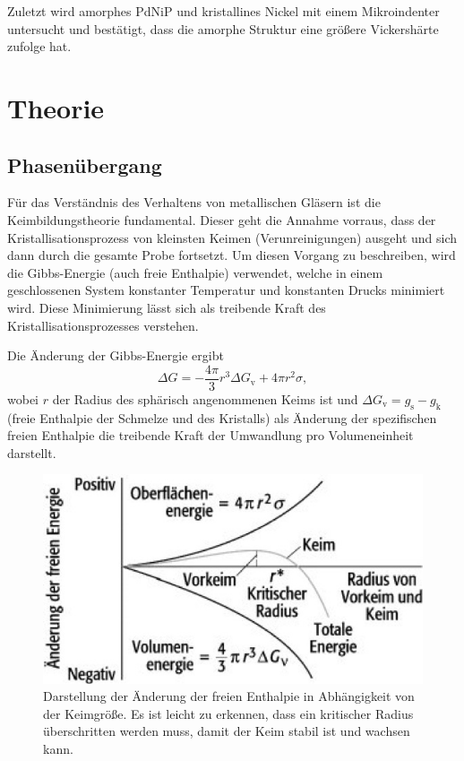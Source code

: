 \documentclass[
	a4paper,
	12pt,
	pagesize,
	ngerman
]{scrartcl}
\begin{document}
	Zuletzt wird amorphes PdNiP und kristallines Nickel mit einem Mikroindenter untersucht und bestätigt, dass die amorphe Struktur eine größere Vickershärte zufolge hat.

  \section{Theorie}

	\subsection{Phasenübergang}

	Für das Verständnis des Verhaltens von metallischen Gläsern ist die Keimbildungstheorie fundamental.
	Dieser geht die Annahme vorraus, dass der Kristallisationsprozess von kleinsten Keimen (Verunreinigungen) ausgeht und sich dann durch die gesamte Probe fortsetzt.
	Um diesen Vorgang zu beschreiben, wird die Gibbs-Energie (auch freie Enthalpie) verwendet, welche in einem geschlossenen System konstanter Temperatur und konstanten Drucks minimiert wird.
	Diese Minimierung lässt sich als treibende Kraft des Kristallisationsprozesses verstehen.


	Die Änderung der Gibbs-Energie ergibt
	\begin{equation} %
		\label{eq_gibbs}
		\Delta G = - \frac{4 \pi}{3} r^3 \Delta G_\text{v} + 4 \pi r^2 \sigma ,
	\end{equation}
	wobei $r$ der Radius des sphärisch angenommenen Keims ist und $\Delta G_\text{v} = g_\text{s} - g_\text{k}$ (freie Enthalpie der Schmelze und des Kristalls) als Änderung der spezifischen freien Enthalpie die treibende Kraft der Umwandlung pro Volumeneinheit darstellt.

	\begin{figure}[H]
			\includegraphics[width= 0.5 \linewidth]{img/radius}
			\caption{
			Darstellung der Änderung der freien Enthalpie in Abhängigkeit von der Keimgröße.
			Es ist leicht zu erkennen, dass ein kritischer Radius überschritten werden muss, damit der Keim stabil ist und wachsen kann.
			\cite{radius_enthalpie}
			}
			\label{fig_radius_enthalpie}
	\end{figure}
\end{document}
